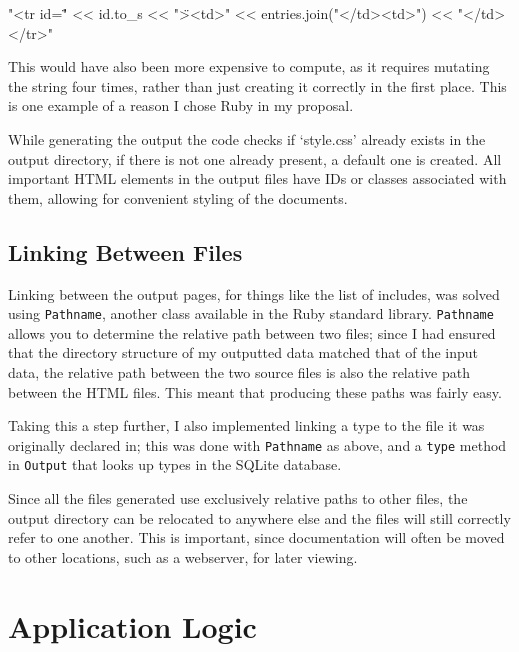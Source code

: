 \begin{code}[language=ruby, gobble=2]
  "<tr id=\"" << id.to_s << "\"><td>" << entries.join("</td><td>") << "</td></tr>\n"
\end{code}

This would have also been more expensive to compute, as it requires mutating the
string four times, rather than just creating it correctly in the first place.
This is one example of a reason I chose Ruby in my proposal.

While generating the output the code checks if `style.css' already exists in the
output directory, if there is not one already present, a default one is created.
All important HTML elements in the output files have IDs or classes associated
with them, allowing for convenient styling of the documents.

\noindent{}

  \subsection{Linking Between Files}
    Linking between the output pages, for things like the list of includes, was
    solved using \lstinline|Pathname|, another class available in the Ruby
    standard library. \lstinline|Pathname| allows you to determine the relative
    path between two files; since I had ensured that the directory structure of
    my outputted data matched that of the input data, the relative path between
    the two source files is also the relative path between the HTML files. This
    meant that producing these paths was fairly easy.

    Taking this a step further, I also implemented linking a type to the file it
    was originally declared in; this was done with \lstinline|Pathname| as
    above, and a \lstinline|type| method in \lstinline|Output| that looks up
    types in the SQLite database.

    Since all the files generated use exclusively relative paths to other files,
    the output directory can be relocated to anywhere else and the files will
    still correctly refer to one another. This is important, since documentation
    will often be moved to other locations, such as a webserver, for later
    viewing.

\section{Application Logic}

